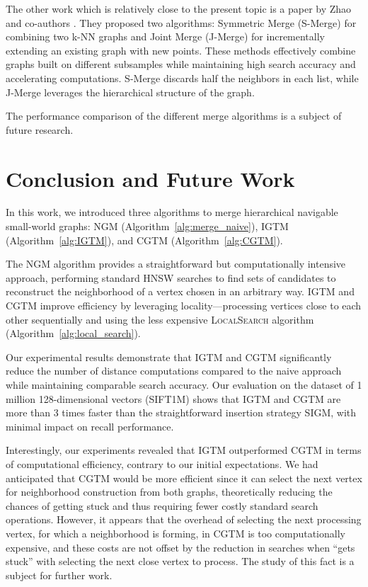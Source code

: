 \documentclass{article}
\begin{document}
The other work which is relatively close to the present topic is a paper by Zhao and co-authors \cite{knnmerge}. They proposed two algorithms: Symmetric Merge (S-Merge) for combining two k-NN graphs and Joint Merge (J-Merge) for incrementally extending an existing graph with new points. These methods effectively combine graphs built on different subsamples while maintaining high search accuracy and accelerating computations. S-Merge discards half the neighbors in each list, while J-Merge leverages the hierarchical structure of the graph.

The performance comparison of the different merge algorithms is a subject of future research. 

\section{Conclusion and Future Work}
\label{sec:conclusion}

In this work, we introduced three algorithms to merge hierarchical navigable small-world graphs: \textsc{NGM} (Algorithm~\ref{alg:merge_naive}), \textsc{IGTM} (Algorithm~\ref{alg:IGTM}), and \textsc{CGTM} (Algorithm~\ref{alg:CGTM}). 

The \textsc{NGM} algorithm provides a straightforward but computationally intensive approach, performing standard HNSW searches to find sets of candidates to reconstruct the neighborhood of a vertex chosen in an arbitrary way. \textsc{IGTM} and \textsc{CGTM} improve efficiency by leveraging locality—processing vertices close to each other sequentially and using the less expensive \textsc{LocalSearch} algorithm (Algorithm~\ref{alg:local_search}).

Our experimental results demonstrate that \textsc{IGTM} and \textsc{CGTM} significantly reduce the number of distance computations compared to the naive approach while maintaining comparable search accuracy. Our evaluation on the dataset of 1 million 128-dimensional vectors (SIFT1M) shows that \textsc{IGTM} and \textsc{CGTM} are more than 3 times faster than the straightforward insertion strategy \textsc{SIGM}, with minimal impact on recall performance.

Interestingly, our experiments revealed that \textsc{IGTM} outperformed \textsc{CGTM} in terms of computational efficiency, contrary to our initial expectations. We had anticipated that \textsc{CGTM} would be more efficient since it can select the next vertex for neighborhood construction from both graphs, theoretically reducing the chances of getting stuck and thus requiring fewer costly standard search operations. However, it appears that the overhead of selecting the next processing vertex, for which a neighborhood is forming, in \textsc{CGTM} is too computationally expensive, and these costs are not offset by the reduction in searches when ``gets stuck'' with selecting the next close vertex to process. The study of this fact is a subject for further work.
\end{document}
